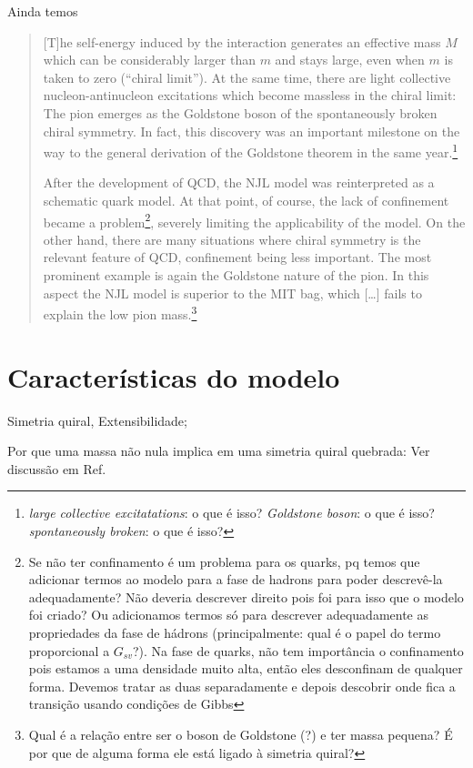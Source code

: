 Ainda temos\cite{Buballa}
\begin{quote}
[T]he self-energy induced by the interaction generates an effective mass $M$ which can be considerably larger than $m$ and stays large, even when $m$ is taken to zero (``chiral limit''). At the same time, there are light collective nucleon-antinucleon excitations which become massless in the chiral limit: The pion emerges as the Goldstone boson of the spontaneously broken chiral symmetry. In fact, this discovery was an important milestone on the way to the general derivation of the Goldstone theorem in the same year.\footnote{\emph{large collective excitatations}: o que é isso? \emph{Goldstone boson}: o que é isso? \emph{spontaneously broken}: o que é isso?}

After the development of QCD, the NJL model was reinterpreted as a schematic quark model. At that point, of course, the lack of confinement became a problem\footnote{Se não ter confinamento é um problema para os quarks, pq temos que adicionar termos ao modelo para a fase de hadrons para poder descrevê-la adequadamente? Não deveria descrever direito pois foi para isso que o modelo foi criado? Ou adicionamos termos só para descrever adequadamente as propriedades da fase de hádrons (principalmente: qual é o papel do termo proporcional a $G_{sv}$?). Na fase de quarks, não tem importância o confinamento pois estamos a uma densidade muito alta, então eles desconfinam de qualquer forma. Devemos tratar as duas separadamente e depois descobrir onde fica a transição usando condições de Gibbs}, severely limiting the applicability of the model. On the other hand, there are many situations where chiral symmetry is the relevant feature of QCD, confinement being less important. The most prominent example is again the Goldstone nature of the pion. In this aspect the NJL model is superior to the MIT bag, which [\dots] fails to explain the low pion mass.\footnote{Qual é a relação entre ser o boson de Goldstone (?) e ter massa pequena? É por que de alguma forma ele está ligado à simetria quiral?}
\end{quote}


\section{Características do modelo}

Simetria quiral, Extensibilidade;

Por que uma massa não nula implica em uma simetria quiral quebrada: Ver discussão em Ref.\cite{Vogl}

